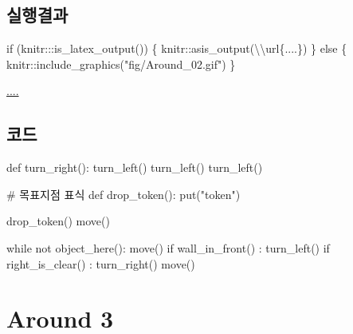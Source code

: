 \documentclass[
  b5paperpaper,
  DIV=11,
  numbers=noendperiod]{scrreprt}
\newenvironment{Shaded}{\begin{snugshade}}{\end{snugshade}}
\newcommand{\CommentTok}[1]{\textcolor[rgb]{0.37,0.37,0.37}{#1}}
\newcommand{\ControlFlowTok}[1]{\textcolor[rgb]{0.00,0.23,0.31}{#1}}
\newcommand{\FunctionTok}[1]{\textcolor[rgb]{0.28,0.35,0.67}{#1}}
\newcommand{\KeywordTok}[1]{\textcolor[rgb]{0.00,0.23,0.31}{#1}}
\newcommand{\NormalTok}[1]{\textcolor[rgb]{0.00,0.23,0.31}{#1}}
\newcommand{\SpecialCharTok}[1]{\textcolor[rgb]{0.37,0.37,0.37}{#1}}
\newcommand{\StringTok}[1]{\textcolor[rgb]{0.13,0.47,0.30}{#1}}
\begin{document}
\hypertarget{uxc2e4uxd589uxacb0uxacfc-6}{%
\subsection{실행결과}\label{uxc2e4uxd589uxacb0uxacfc-6}}

\begin{Shaded}
\begin{Highlighting}[]
\ControlFlowTok{if}\NormalTok{ (knitr}\SpecialCharTok{:::}\FunctionTok{is\_latex\_output}\NormalTok{()) \{}
\NormalTok{  knitr}\SpecialCharTok{::}\FunctionTok{asis\_output}\NormalTok{(}\StringTok{\textquotesingle{}}\SpecialCharTok{\textbackslash{}\textbackslash{}}\StringTok{url\{....\}\textquotesingle{}}\NormalTok{)}
\NormalTok{\} }\ControlFlowTok{else}\NormalTok{ \{}
\NormalTok{  knitr}\SpecialCharTok{::}\FunctionTok{include\_graphics}\NormalTok{(}\StringTok{"fig/Around\_02.gif"}\NormalTok{)}
\NormalTok{\}}
\end{Highlighting}
\end{Shaded}

\url{....}

\hypertarget{uxcf54uxb4dc-6}{%
\subsection{코드}\label{uxcf54uxb4dc-6}}

\begin{Shaded}
\begin{Highlighting}[]
\KeywordTok{def}\NormalTok{ turn\_right():}
\NormalTok{    turn\_left()}
\NormalTok{    turn\_left()}
\NormalTok{    turn\_left()}

\CommentTok{\# 목표지점 표식    }
\KeywordTok{def}\NormalTok{ drop\_token():}
\NormalTok{    put(}\StringTok{"token"}\NormalTok{)}

\NormalTok{drop\_token()}
\NormalTok{move()}

\ControlFlowTok{while} \KeywordTok{not}\NormalTok{ object\_here():}
\NormalTok{    move()}
    \ControlFlowTok{if}\NormalTok{ wall\_in\_front() :}
\NormalTok{        turn\_left()}
    \ControlFlowTok{if}\NormalTok{ right\_is\_clear() :}
\NormalTok{        turn\_right()}
\NormalTok{        move()}
\end{Highlighting}
\end{Shaded}

\hypertarget{around-03}{%
\section{Around 3}\label{around-03}}
\end{document}
